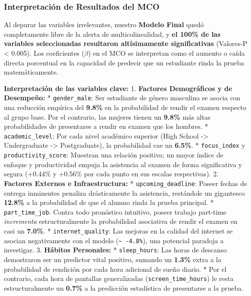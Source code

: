 \documentclass[11pt]{article}
\begin{document}
    \begin{Verbatim}[commandchars=\\\{\}]

    \end{Verbatim}

    \subsubsection{Interpretación de Resultados del
MCO}\label{interpretaciuxf3n-de-resultados-del-mco}

Al depurar las variables irrelevantes, nuestro \textbf{Modelo Final}
quedó completamente libre de la alerta de multicolinealidad, y
\textbf{el 100\% de las variables seleccionadas resultaron altísimamente
significativas} (Valores-P \textless{} 0.005). Los coeficientes
(\(\beta\)) en el MCO se interpretan como el aumento o caída directa
porcentual en la capacidad de predecir que un estudiante rinda la prueba
matemáticamente.

\textbf{Interpretación de las variables clave:} 1. \textbf{Factores
Demográficos y de Desempeño:} * \texttt{gender\_male}: Ser estudiante de
género masculino se asocia con una reducción empírica del \textbf{9.8\%}
en la probabilidad de rendir el examen respecto al grupo base. Por el
contrario, las mujeres tienen un \textbf{9.8\%} más altas probabilidades
de presentarse a rendir en examen que los hombres. *
\texttt{academic\_level}: Por cada nivel académico superior (High School
-\textgreater{} Undergraduate -\textgreater{} Postgraduate), la
probabilidad cae un \textbf{6.5\%}. * \texttt{focus\_index} y
\texttt{productivity\_score}: Muestran una relación positiva; un mayor
índice de enfoque y productividad empuja la asistencia al examen de
forma significativa y segura (+0.44\% y +0.56\% por cada punto en sus
escalas respectivas). 2. \textbf{Factores Externos e Infraestructura:} *
\texttt{upcoming\_deadline}: Poseer fechas de entrega inminentes
penaliza drásticamente la asistencia, restándole un gigantesco
\textbf{12.8\%} a la probabilidad de que el alumno rinda la prueba
principal. * \texttt{part\_time\_job}: Contra todo pronóstico intuitivo,
poseer trabajo part-time \emph{incrementa} estructuralmente la
probabilidad asociativa de rendir el examen en casi un \textbf{7.0\%}. *
\texttt{internet\_quality}: Las mejoras en la calidad del internet se
asocian negativamente con el modelo
(\texttt{\textasciitilde{}\ -4.8\%}), una potencial paradoja a
investigar. 3. \textbf{Hábitos Personales:} * \texttt{sleep\_hours}: Las
horas de descanso demostraron ser un predictor vital positivo, sumando
un \textbf{1.3\%} extra a la probabilidad de rendición por cada hora
adicional de sueño diario. * Por el contrario, cada hora de pantallas
generalizadas (\texttt{screen\_time\_hours}) le resta estructuralmente
un \textbf{0.7\%} a la predicción estadística de presentarse a la
prueba.
\end{document}
